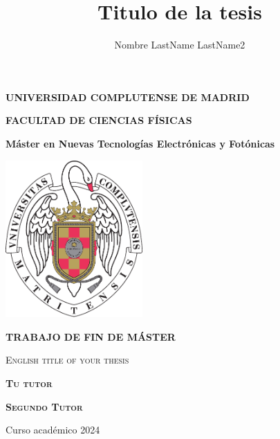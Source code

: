 \documentclass[12pt, american, spanish]{../packages/masterfotonicaucm}
\title{%
    Titulo de la tesis
}
\author{Nombre LastName LastName2}
\newcommand{\theenglishtitle}{English title of your thesis}
\newcommand{\thetutor}{
   Tu tutor %
}
\newcommand{\thetutortwo}{
    Segundo Tutor%
}
\begin{document}

\begin{titlepage}
    \begin{center}


        \textbf{\Large{}UNIVERSIDAD COMPLUTENSE DE MADRID}
        \vspace{0.5cm}

        \textbf{\Large{}FACULTAD DE CIENCIAS FÍSICAS}
        \vspace{1cm}

        { \textbf{\large{}Máster en Nuevas Tecnologías Electrónicas y Fotónicas}} %
        \vspace{0.8cm}

        {\includegraphics[height=6cm]{ucm-logo.pdf}}
        \vspace{0.8cm}

        \textbf{\Large{}TRABAJO DE FIN DE MÁSTER} %
        \vspace{2cm}

        \textbf{\Large{}\thetitle}%

        \textsc{ \theenglishtitle}%

        \vspace{20mm}

        {\bfseries \LARGE{}\theauthor}%
        \vspace{10mm}

        \textbf{\textsc{\Large{}\thetutor}}%
        \vspace{5mm}

        \textbf{\textsc{\Large{}\thetutortwo}}%
        \vspace{15mm}

        {\large{}Curso académico 2024}%
        \vspace{5mm}
    \end{center}
\end{titlepage}%
\cleardoublepage%
\end{document}
